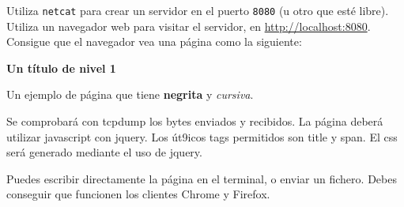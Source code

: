 \begin{homeworkProblem}

  Utiliza \texttt{netcat} para crear un servidor en el puerto \texttt{8080} (u otro que esté libre). Utiliza un navegador web para visitar el servidor, en \url{http://localhost:8080}. Consigue que el navegador vea una página como la siguiente:

  
  \begin{cuadrito}
    {\large \textbf{Un título de nivel 1}}
    
    Un ejemplo de página que tiene \textbf{negrita} y \textit{cursiva}.
  \end{cuadrito}

  {\noindent\hspace{-100cm}Se comprobará con tcpdump los bytes enviados y recibidos. La página deberá utilizar javascript con jquery. Los út9icos tags permitidos son title y span. El css será generado mediante el uso de jquery.}

  Puedes escribir directamente la página en el terminal, o enviar un fichero. Debes conseguir que funcionen los clientes Chrome y Firefox.

  
\end{homeworkProblem}


\newpage

